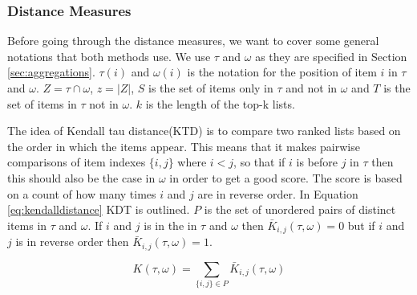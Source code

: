 \subsubsection{Distance Measures}\label{sec:distance}
Before going through the distance measures, we want to cover some general notations that both methods use. We use $\tau$ and $\omega$ as they are specified in Section \ref{sec:aggregations}. $\tau(i)$ and $\omega(i)$ is the notation for the position of item $i$ in $\tau$ and $\omega$. $Z = \tau \cap \omega$, $z=|Z|$, $S$ is the set of items only in $\tau$ and not in $\omega$ and $T$ is the set of items in $\tau$ not in $\omega$. $k$ is the length of the top-k lists.

The idea of Kendall tau distance(KTD) is to compare two ranked lists based on the order in which the items appear\cite{comparing:topk}. This means that it makes pairwise comparisons of item indexes $\{i,j\}$ where $i < j$, so that if $i$ is before $j$ in $\tau$ then this should also be the case in $\omega$ in order to get a good score. The score is based on a count of how many times $i$ and $j$ are in reverse order. In Equation \ref{eq:kendalldistance} KDT is outlined. $P$ is the set of unordered pairs of distinct items in $\tau$ and $\omega$. If $i$ and $j$ is in the in $\tau$ and $\omega$ then $\bar{K}_{i,j}(\tau,\omega) = 0$ but if $i$ and $j$ is in reverse order then $\bar{K}_{i,j}(\tau,\omega) = 1$.	

\begin{equation}\label{eq:kendalldistace}
K(\tau,\omega) = \sum_{\{i,j\} \in P }\bar{K}_{i,j}(\tau,\omega)
\end{equation}


